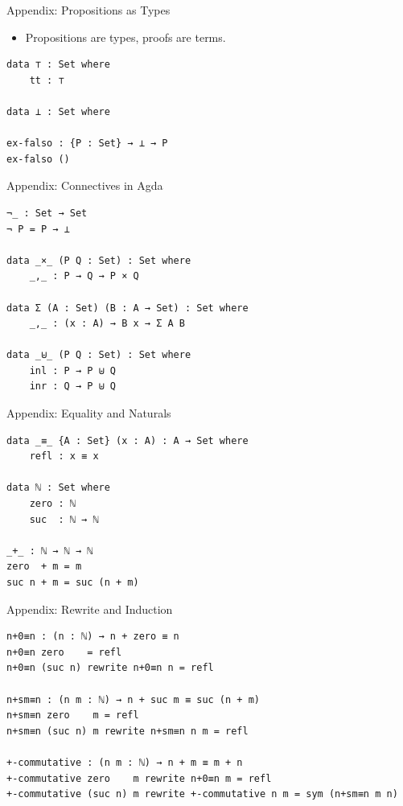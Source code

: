 \documentclass[10pt,compress,aspectratio=169]{beamer}
\begin{document}
\begin{frame}[fragile]{Appendix: Propositions as Types}
\begin{itemize}
    \item Propositions are types, proofs are terms.
\end{itemize}
\begin{verbatim}
data ⊤ : Set where
    tt : ⊤

data ⊥ : Set where

ex-falso : {P : Set} → ⊥ → P
ex-falso ()
\end{verbatim}
\end{frame}

\begin{frame}[fragile]{Appendix: Connectives in Agda}
\begin{verbatim}
¬_ : Set → Set
¬ P = P → ⊥

data _×_ (P Q : Set) : Set where
    _,_ : P → Q → P × Q

data Σ (A : Set) (B : A → Set) : Set where
    _,_ : (x : A) → B x → Σ A B

data _⊎_ (P Q : Set) : Set where
    inl : P → P ⊎ Q
    inr : Q → P ⊎ Q
\end{verbatim}
\end{frame}

\begin{frame}[fragile]{Appendix: Equality and Naturals}
\begin{verbatim}
data _≡_ {A : Set} (x : A) : A → Set where
    refl : x ≡ x

data ℕ : Set where
    zero : ℕ
    suc  : ℕ → ℕ

_+_ : ℕ → ℕ → ℕ
zero  + m = m
suc n + m = suc (n + m)
\end{verbatim}
\end{frame}

\begin{frame}[fragile]{Appendix: Rewrite and Induction}
\begin{verbatim}
n+0≡n : (n : ℕ) → n + zero ≡ n
n+0≡n zero    = refl
n+0≡n (suc n) rewrite n+0≡n n = refl

n+sm≡n : (n m : ℕ) → n + suc m ≡ suc (n + m)
n+sm≡n zero    m = refl
n+sm≡n (suc n) m rewrite n+sm≡n n m = refl

+-commutative : (n m : ℕ) → n + m ≡ m + n
+-commutative zero    m rewrite n+0≡n m = refl
+-commutative (suc n) m rewrite +-commutative n m = sym (n+sm≡n m n)
\end{verbatim}
\end{frame}
\end{document}
